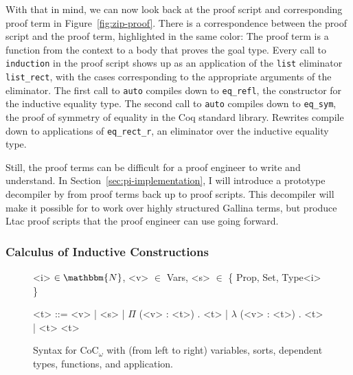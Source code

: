 With that in mind, we can now look back at the proof script and corresponding proof term in Figure~\ref{fig:zip-proof}.
There is a correspondence between the proof script and the proof term, highlighted in the same color:
The proof term is a function from the context to a body that proves the goal type.
Every call to \lstinline{induction} in the proof script shows up as an application of the \lstinline{list} eliminator 
\lstinline{list_rect}, with the cases corresponding to the appropriate arguments of the eliminator.
The first call to \lstinline{auto} compiles down to \lstinline{eq_refl}, the constructor for the inductive equality type.
The second call to \lstinline{auto} compiles down to \lstinline{eq_sym}, the proof of symmetry of equality in the Coq standard library. %
Rewrites compile down to applications of \lstinline{eq_rect_r}, an eliminator over the inductive equality type.

Still, the proof terms can be difficult for a proof engineer to write and understand.
In Section~\ref{sec:pi-implementation}, I will introduce a prototype decompiler by  from proof terms back up to proof scripts.
This decompiler will make it possible for \sysnamelong to work over highly structured Gallina terms,
but produce Ltac proof scripts that the proof engineer can use going forward.

\subsubsection{Calculus of Inductive Constructions}
\label{sec:cic}

\begin{figure*}
\small
\begin{grammar}
<i> $\in \mathbbm{N}$, <v> $\in$ Vars, <s> $\in$ \{ Prop, Set, Type<i> \}

<t> ::= <v> \hspace{0.06cm} | \hspace{0.06cm} <s> \hspace{0.06cm} | \hspace{0.06cm} $\Pi$ (<v> : <t>) . <t> \hspace{0.06cm} | \hspace{0.06cm} $\lambda$ (<v> : <t>) . <t> \hspace{0.06cm} | \hspace{0.06cm} <t> <t>
\end{grammar}
\vspace{-0.3cm}
\caption{Syntax for CoC$_\omega$ with (from left to right) variables, sorts, dependent types, functions, and application.}
\label{fig:coc-syntax}
\end{figure*}

